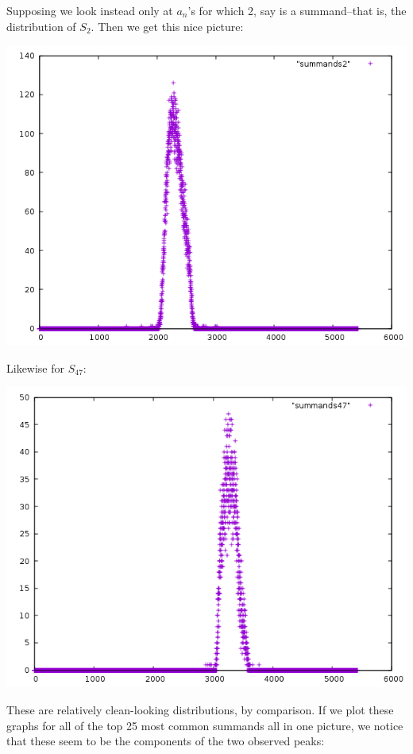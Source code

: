 \documentclass{report}
\theoremstyle{remark}
\numberwithin{equation}{section}
\begin{document}
Supposing we look instead only at $a_n$'s for which 2, say is a
summand--that is, the distribution of $S_2$.  Then we get this nice
picture:

\includegraphics[scale=0.5]{../figs/summands2.png}

Likewise for $S_{47}$:

\includegraphics[scale=0.5]{../figs/summands47.png}

These are relatively clean-looking distributions, by comparison.  If
we plot these graphs for all of the top 25 most common summands all in
one picture, we notice that these seem to be the components of the two
observed peaks:
\end{document}
